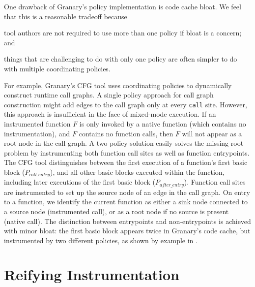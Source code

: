 \documentclass[preprint]{sigplanconf}
\begin{document}
One drawback of Granary's policy implementation is code cache bloat. We feel that this is a reasonable tradeoff because \begin{inparaenum}[i)]
	\item tool authors are not required to use more than one policy if bloat is a concern; and
	\item things that are challenging to do with only one policy are often simpler to do with multiple coordinating policies.
\end{inparaenum} For example, Granary's CFG tool uses coordinating policies to dynamically construct runtime call graphs. A single policy approach for call graph construction might add edges to the call graph only at every \texttt{call} site. However, this approach is insufficient in the face of mixed-mode execution. If an instrumented function $F$ is only invoked by a native function (which contains no instrumentation), and $F$ contains no function calls, then $F$ will not appear as a root node in the call graph. A two-policy solution easily solves the missing root problem by instrumenting both function call sites as well as function entrypoints. The CFG tool distinguishes between the first execution of a function's first basic block ($P_{call\_entry}$), and all other basic blocks executed within the function, including later executions of the first basic block ($P_{after\_entry}$). Function call sites are instrumented to set up the source node of an edge in the call graph. On entry to a function, we identify the current function as either a sink node connected to a source node (instrumented call), or as a root node if no source is present (native call). The distinction between entrypoints and non-entrypoints is achieved with minor bloat: the first basic block appears twice in Granary's code cache, but instrumented by two different policies, as shown by example in .




\section{Reifying Instrumentation}\label{sec:reify}
\end{document}
